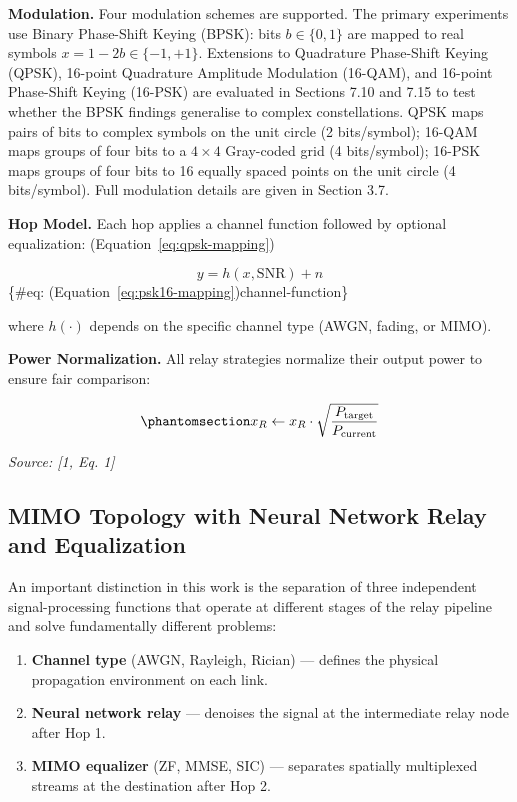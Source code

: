 \textbf{Modulation.} Four modulation schemes are supported. The primary experiments use Binary Phase-Shift Keying (BPSK): bits \(b \in \{0, 1\}\) are mapped to real symbols \(x = 1 - 2b \in \{-1, +1\}\). Extensions to Quadrature Phase-Shift Keying (QPSK), 16-point Quadrature Amplitude Modulation (16-QAM), and 16-point Phase-Shift Keying (16-PSK) are evaluated in Sections 7.10 and 7.15 to test whether the BPSK findings generalise to complex constellations. QPSK maps pairs of bits to complex symbols on the unit circle (2 bits/symbol); 16-QAM maps groups of four bits to a \(4 \times 4\) Gray-coded grid (4 bits/symbol); 16-PSK maps groups of four bits to 16 equally spaced points on the unit circle (4 bits/symbol). Full modulation details are given in Section 3.7.

\textbf{Hop Model.} Each hop applies a channel function followed by optional equalization: (Equation~\ref{eq:qpsk-mapping})

\[y = h(x, \text{SNR}) + n
\] \{\#eq: (Equation~\ref{eq:psk16-mapping})channel-function\}

where \(h(\cdot)\) depends on the specific channel type (AWGN, fading, or MIMO).

\textbf{Power Normalization.} All relay strategies normalize their output power to ensure fair comparison:

\begin{equation}\protect\phantomsection\label{eq:power-normalization}{x_R \leftarrow x_R \cdot \sqrt{\frac{P_{\text{target}}}{P_{\text{current}}}}
}\end{equation} \par{\small\textit{Source: [1, Eq. 1]}}

\subsection{MIMO Topology with Neural Network Relay and Equalization}\label{sec:mimo-topology-with-neural-network-relay-and-equalization}

An important distinction in this work is the separation of three independent signal-processing functions that operate at different stages of the relay pipeline and solve fundamentally different problems:

\begin{enumerate}
\def\labelenumi{\arabic{enumi}.}
\tightlist
\item
  \textbf{Channel type} (AWGN, Rayleigh, Rician) --- defines the physical propagation environment on each link.
\item
  \textbf{Neural network relay} --- denoises the signal at the intermediate relay node after Hop 1.
\item
  \textbf{MIMO equalizer} (ZF, MMSE, SIC) --- separates spatially multiplexed streams at the destination after Hop 2.
\end{enumerate}

